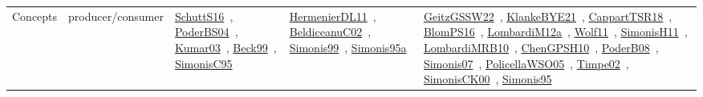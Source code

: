 {\begin{longtable}{lp{3cm}>{\raggedright\arraybackslash}p{6cm}>{\raggedright\arraybackslash}p{6cm}>{\raggedright\arraybackslash}p{8cm}}
\index{producer/consumer}\index{Concepts!producer/consumer}Concepts & producer/consumer & \href{../works/SchuttS16.pdf}{SchuttS16}~\cite{SchuttS16}, \href{../works/PoderBS04.pdf}{PoderBS04}~\cite{PoderBS04}, \href{../works/Kumar03.pdf}{Kumar03}~\cite{Kumar03}, \href{../works/Beck99.pdf}{Beck99}~\cite{Beck99}, \href{../works/SimonisC95.pdf}{SimonisC95}~\cite{SimonisC95} & \href{../works/HermenierDL11.pdf}{HermenierDL11}~\cite{HermenierDL11}, \href{../works/BeldiceanuC02.pdf}{BeldiceanuC02}~\cite{BeldiceanuC02}, \href{../works/Simonis99.pdf}{Simonis99}~\cite{Simonis99}, \href{../works/Simonis95a.pdf}{Simonis95a}~\cite{Simonis95a} & \href{../works/GeitzGSSW22.pdf}{GeitzGSSW22}~\cite{GeitzGSSW22}, \href{../works/KlankeBYE21.pdf}{KlankeBYE21}~\cite{KlankeBYE21}, \href{../works/CappartTSR18.pdf}{CappartTSR18}~\cite{CappartTSR18}, \href{../works/BlomPS16.pdf}{BlomPS16}~\cite{BlomPS16}, \href{../works/LombardiM12a.pdf}{LombardiM12a}~\cite{LombardiM12a}, \href{../works/Wolf11.pdf}{Wolf11}~\cite{Wolf11}, \href{../works/SimonisH11.pdf}{SimonisH11}~\cite{SimonisH11}, \href{../works/LombardiMRB10.pdf}{LombardiMRB10}~\cite{LombardiMRB10}, \href{../works/ChenGPSH10.pdf}{ChenGPSH10}~\cite{ChenGPSH10}, \href{../works/PoderB08.pdf}{PoderB08}~\cite{PoderB08}, \href{../works/Simonis07.pdf}{Simonis07}~\cite{Simonis07}, \href{../works/PolicellaWSO05.pdf}{PolicellaWSO05}~\cite{PolicellaWSO05}, \href{../works/Timpe02.pdf}{Timpe02}~\cite{Timpe02}, \href{../works/SimonisCK00.pdf}{SimonisCK00}~\cite{SimonisCK00}, \href{../works/Simonis95.pdf}{Simonis95}~\cite{Simonis95}\\

\end{longtable}}
